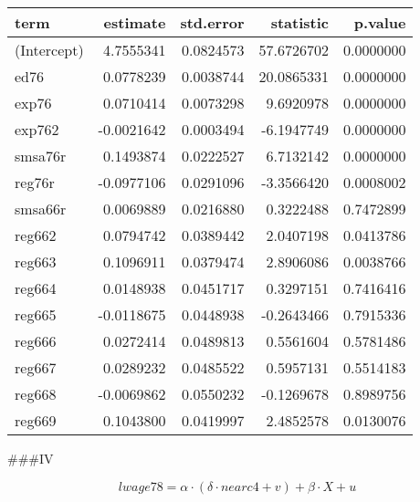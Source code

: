 \documentclass[
]{article}
\begin{document}
\begin{longtable}[]{@{}lrrrr@{}}
\toprule
term & estimate & std.error & statistic & p.value \\
\midrule
\endhead
(Intercept) & 4.7555341 & 0.0824573 & 57.6726702 & 0.0000000 \\
ed76 & 0.0778239 & 0.0038744 & 20.0865331 & 0.0000000 \\
exp76 & 0.0710414 & 0.0073298 & 9.6920978 & 0.0000000 \\
exp762 & -0.0021642 & 0.0003494 & -6.1947749 & 0.0000000 \\
smsa76r & 0.1493874 & 0.0222527 & 6.7132142 & 0.0000000 \\
reg76r & -0.0977106 & 0.0291096 & -3.3566420 & 0.0008002 \\
smsa66r & 0.0069889 & 0.0216880 & 0.3222488 & 0.7472899 \\
reg662 & 0.0794742 & 0.0389442 & 2.0407198 & 0.0413786 \\
reg663 & 0.1096911 & 0.0379474 & 2.8906086 & 0.0038766 \\
reg664 & 0.0148938 & 0.0451717 & 0.3297151 & 0.7416416 \\
reg665 & -0.0118675 & 0.0448938 & -0.2643466 & 0.7915336 \\
reg666 & 0.0272414 & 0.0489813 & 0.5561604 & 0.5781486 \\
reg667 & 0.0289232 & 0.0485522 & 0.5957131 & 0.5514183 \\
reg668 & -0.0069862 & 0.0550232 & -0.1269678 & 0.8989756 \\
reg669 & 0.1043800 & 0.0419997 & 2.4852578 & 0.0130076 \\
\bottomrule
\end{longtable}

\#\#\#IV

\[ lwage78 = \alpha \cdot (\delta \cdot nearc4 + v) + \beta \cdot X  + u\]
\end{document}

